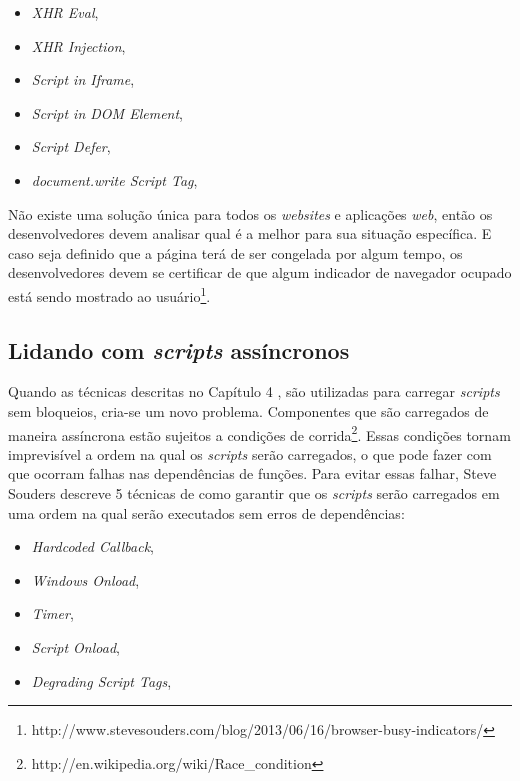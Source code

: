 \begin{itemize}
	\item \textit{XHR Eval}, \cite[p.~29]{EvenFaster}
	\item \textit{XHR Injection}, \cite[p.~31]{EvenFaster}
	\item \textit{Script in Iframe}, \cite[p.~31]{EvenFaster}
	\item \textit{Script in DOM Element}, \cite[p.~32]{EvenFaster}
	\item \textit{Script Defer}, \cite[p.~32]{EvenFaster}
	\item \textit{document.write Script Tag}, \cite[p.~33]{EvenFaster}
\end{itemize}

Não existe uma solução única para todos os \textit{websites} e aplicações \textit{web}, então os desenvolvedores devem analisar qual é a melhor para sua situação específica. E caso seja definido que a página terá de ser congelada por algum tempo, os desenvolvedores devem se certificar de que algum indicador de navegador ocupado está sendo mostrado ao usuário\footnote{http://www.stevesouders.com/blog/2013/06/16/browser-busy-indicators/}.

\subsection{Lidando com \textit{scripts} assíncronos}
\label{subsec:evenfaster_cap5}
Quando as técnicas descritas no Capítulo 4 \cite[p.~27]{EvenFaster}, são utilizadas para carregar \textit{scripts} sem bloqueios, cria-se um novo problema. Componentes que são carregados de maneira assíncrona estão sujeitos a condições de corrida\footnote{http://en.wikipedia.org/wiki/Race\_condition}. Essas condições tornam imprevisível a ordem na qual os \textit{scripts} serão carregados, o que pode fazer com que ocorram falhas nas dependências de funções. Para evitar essas falhar, Steve Souders descreve 5 técnicas de como garantir que os \textit{scripts} serão carregados em uma ordem na qual serão executados sem erros de dependências:

\begin{itemize}
	\item \textit{Hardcoded Callback}, \cite[p.~46]{EvenFaster}
	\item \textit{Windows Onload}, \cite[p.~47]{EvenFaster}
	\item \textit{Timer}, \cite[p.~48]{EvenFaster}
	\item \textit{Script Onload}, \cite[p.~49]{EvenFaster}
	\item \textit{Degrading Script Tags}, \cite[p.~50]{EvenFaster}
\end{itemize}

